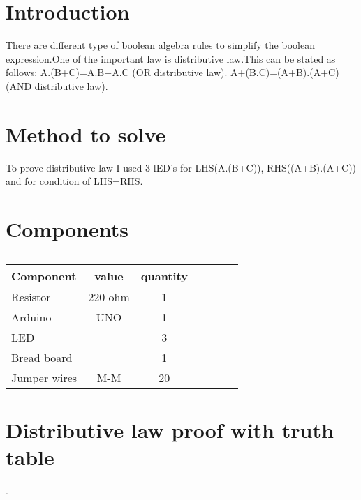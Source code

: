 \documentclass[10pt, a4paper]{article}
\title{\mytitle}
\author{\myauthor\hspace{1em}\\\contact\\IITH\hspace{0.5em}-\hspace{0.5em}\mymodule}
\date{}
\begin{document}
  \maketitle
\tableofcontents

\section{Introduction}

There are different type of boolean algebra rules to simplify the boolean expression.One of the important law is distributive law.This can be stated as follows:
         A.(B+C)=A.B+A.C (OR distributive law).
         A+(B.C)=(A+B).(A+C) (AND distributive law).


\section{Method to solve}


To prove distributive law I used 3 lED's for LHS(A.(B+C)), RHS((A+B).(A+C)) and for condition of LHS=RHS.




\section{Components}

\begin{table}[htbp]
 \begin{center}
    \begin{tabular}{|l|c|c|c|c|c|c} \hline \textbf{Component}
  & \textbf{value} & \textbf{quantity} \\
 \hline
Resistor & 220 ohm & 1 \\ \hline
Arduino & UNO & 1 \\ \hline
LED &  & 3 \\ \hline
Bread board &  & 1 \\ \hline
Jumper wires & M-M & 20\\ \hline
\end{tabular}   
\end{center}
\caption{\label{table:dummytable} }
\end{table}


\section{Distributive law proof with truth table}
\vspace*{16mm}
.
\end{document}
